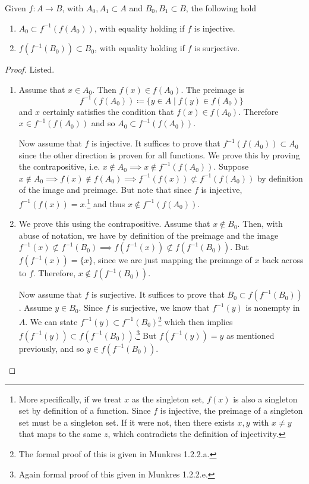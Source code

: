   \begin{theorem}
    Given $f: A \rightarrow B$, with $A_0, A_1 \subset A$ and $B_0, B_1 \subset B$, the following hold 
    \begin{enumerate}
      \item $A_0 \subset f^{-1} (f(A_0))$, with equality holding if $f$ is injective. 
      \item $f(f^{-1}(B_0)) \subset B_0$, with equality holding if $f$ is surjective. 
    \end{enumerate}
  \end{theorem} 
  \begin{proof} 
    Listed. 
    \begin{enumerate}
      \item Assume that $x \in A_0$. Then $f(x) \in f(A_0)$. The preimage is 
      \begin{equation}
        f^{-1} (f(A_0)) \coloneqq \{ y \in A \mid f(y) \in f(A_0) \}
      \end{equation}
      and $x$ certainly satisfies the condition that $f(x) \in f(A_0)$. Therefore $x \in f^{-1} (f(A_0))$ and so $A_0 \subset f^{-1} (f(A_0))$. 

      Now assume that $f$ is injective. It suffices to prove that $f^{-1} (f(A_0)) \subset A_0$ since the other direction is proven for all functions. We prove this by proving the contrapositive, i.e. $x \not\in A_0 \implies x \not\in f^{-1} (f(A_0))$. Suppose $x \not\in A_0 \implies f(x) \not\in f(A_0) \implies f^{-1} (f(x)) \not\subset f^{-1} (f(A_0))$ by definition of the image and preimage. But note that since $f$ is injective, $f^{-1} (f(x)) = x$.\footnote{More specifically, if we treat $x$ as the singleton set, $f(x)$ is also a singleton set by definition of a function. Since $f$ is injective, the preimage of a singleton set must be a singleton set. If it were not, then there exists $x, y$ with $x \neq y$ that maps to the same $z$, which contradicts the definition of injectivity.} and thus $x \not\in f^{-1} (f(A_0))$. 

      \item We prove this using the contrapositive. Assume that $x \not\in B_0$. Then, with abuse of notation, we have by definition of the preimage and the image $f^{-1} (x) \not\subset f^{-1} (B_0) \implies f(f^{-1} (x)) \not\subset f(f^{-1}(B_0))$. But $f (f^{-1} (x)) = \{x\}$, since we are just mapping the preimage of $x$ back across to $f$. Therefore, $x \notin f( f^{-1} (B_0))$. 

      Now assume that $f$ is surjective. It suffices to prove that $B_0 \subset f (f^{-1}(B_0))$. Assume $y \in B_0$. Since $f$ is surjective, we know that $f^{-1} (y)$ is nonempty in $A$. We can state $f^{-1}(y) \subset f^{-1} (B_0)$\footnote{The formal proof of this is given in Munkres 1.2.2.a.} which then implies $f(f^{-1} (y)) \subset f (f^{-1} (B_0))$.\footnote{Again formal proof of this given in Munkres 1.2.2.e.} But $f (f^{-1} (y)) = y$ as mentioned previously, and so $y \in f(f^{-1} (B_0))$. 
    \end{enumerate}
  \end{proof}


